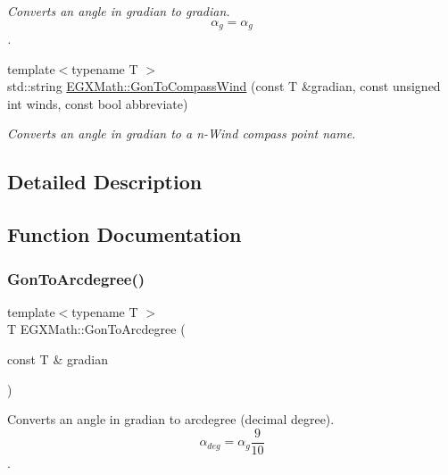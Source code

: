 \begin{DoxyCompactItemize}
\begin{DoxyCompactList}\small\item\em Converts an angle in gradian to gradian. \[\alpha_{g}=\alpha_{g}\]. \end{DoxyCompactList}\item 
{\footnotesize template$<$typename T $>$ }\\std\+::string \mbox{\hyperlink{group___e_g_x_math-_angle_conversions-_gon_ga1d8ed4116236694608d7409aa149f677}{E\+G\+X\+Math\+::\+Gon\+To\+Compass\+Wind}} (const T \&gradian, const unsigned int winds, const bool abbreviate)
\begin{DoxyCompactList}\small\item\em Converts an angle in gradian to a n-\/\+Wind compass point name. \end{DoxyCompactList}\end{DoxyCompactItemize}


\subsection{Detailed Description}


\subsection{Function Documentation}
\mbox{\label{group___e_g_x_math-_angle_conversions-_gon_ga00757282768841abe48ac3c8452627cb}} 
\subsubsection{\texorpdfstring{Gon\+To\+Arcdegree()}{GonToArcdegree()}}
{\footnotesize\ttfamily template$<$typename T $>$ \\
T E\+G\+X\+Math\+::\+Gon\+To\+Arcdegree (\begin{DoxyParamCaption}\item[{const T \&}]{gradian }\end{DoxyParamCaption})}



Converts an angle in gradian to arcdegree (decimal degree). \[\alpha_{deg}=\alpha_{g}\frac{9}{10}\]. 

